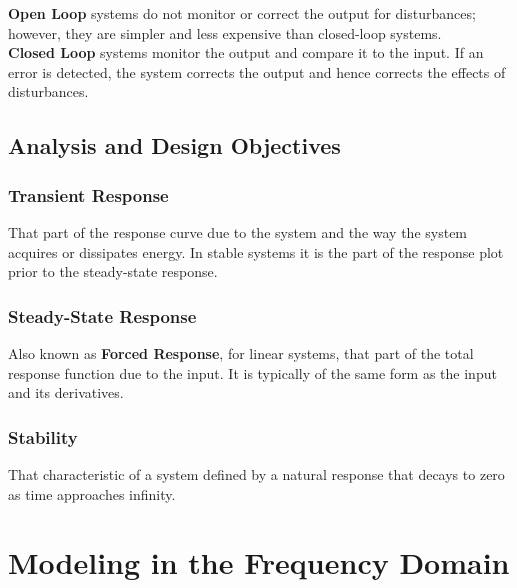 \documentclass[11pt]{article}
\begin{document}
    \textbf{Open Loop} systems do not monitor or correct the output for disturbances; however, they are simpler and less expensive than closed-loop systems. \\ 

    \textbf{Closed Loop} systems monitor the output and compare it to the input. If an error is detected, the system corrects the output and hence corrects the effects of disturbances.

    \subsection{Analysis and Design Objectives}

    \subsubsection{Transient Response}

    That part of the response curve due to the system and the way the system acquires or dissipates energy. In stable systems it is the part of the response plot prior to the steady-state response.

    \subsubsection{Steady-State Response}

    Also known as \textbf{Forced Response}, for linear systems, that part of the total response function due to the input. It is typically of the same form as the input and its derivatives.

    \subsubsection{Stability}

    That characteristic of a system defined by a natural response that decays to zero as time approaches infinity.

    \pagebreak


    \section{Modeling in the Frequency Domain}

    \pagebreak

    
\end{document}
